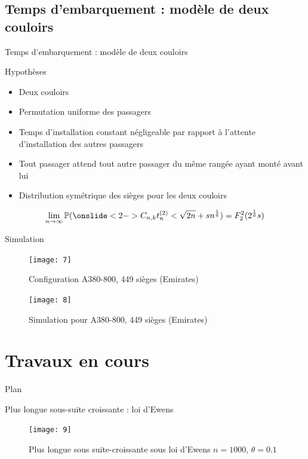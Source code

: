 \documentclass[french]{beamer}
\begin{document}
\subsection{Temps d’embarquement : modèle de deux couloirs}
\begin{frame}{Temps d’embarquement : modèle de deux couloirs  }
\begin{block}{Hypothèses}
\begin{itemize}
\item<1-2> Deux couloirs
\item<1-2> Permutation uniforme des passagers 
\item<1-2> Temps d'installation constant négligeable par rapport à l'attente d'installation des autres passagers 
\item<2> Tout passager attend tout autre passager du même rangée ayant monté avant lui
\item<2> Distribution symétrique des sièges pour les deux couloirs 
\end{itemize}
\end{block}
\begin{align*}
\lim_{n\to \infty}
\mathbb{P}( \onslide<2->{C_{n,k}}t_n^{(2)}< \sqrt{2n}+sn^\frac 1 6) = F^{2}_2(2^\frac{1}{6}s)  
\end{align*}

\end{frame}
\begin{frame}{Simulation}
\begin{figure}[ht]
    \centering
  \texttt{[image: 7]}
\caption {Configuration A380-800, 449 sièges (Emirates)}
\end{figure}
\begin{figure}[ht]
    \centering
  \texttt{[image: 8]}
\caption {Simulation pour A380-800, 449 sièges (Emirates)}
\end{figure}
\end{frame}

\section{Travaux en cours}
\begin{frame}{Plan}
\tableofcontents[currentsection,currentsubsection, 
    hideothersubsections, 
    sectionstyle=show/shaded,
]
\end{frame}
\begin{frame}{Plus longue sous-suite croissante : loi d’Ewens}
\begin{figure}[ht]
    \centering
  \texttt{[image: 9]}
\caption {Plus longue sous suite-croissante sous loi d’Ewens $n=1000$, $\theta=0.1$
}
\end{figure}
\end{frame}
\end{document}
